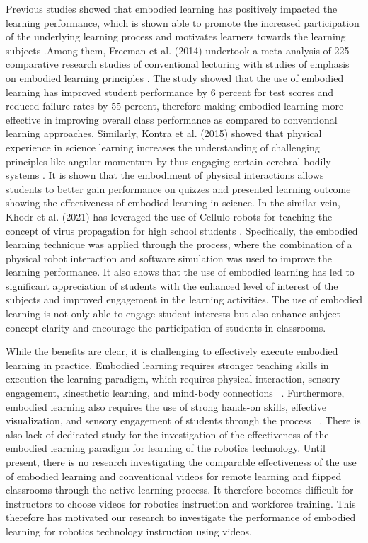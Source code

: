 \documentclass[12pt]{article}
\begin{document}
Previous studies showed that embodied learning has positively impacted the learning performance, which is shown able to promote the increased participation of the underlying learning process and motivates learners towards the learning subjects \cite{kontra2012embodied,ioannou2020technology}.Among them, Freeman et al. (2014) undertook a meta-analysis of 225 comparative research studies of conventional lecturing with studies of emphasis on embodied learning principles \cite{freeman2014active}. The study showed that the use of embodied learning has improved student performance by 6 percent for test scores and reduced failure rates by 55 percent, therefore making embodied learning more effective in improving overall class performance as compared to conventional learning approaches. Similarly, Kontra et al. (2015) showed that physical experience in science learning increases the understanding of challenging principles like angular momentum by thus engaging certain cerebral bodily systems \cite{kontra2015physical}. It is shown that the embodiment of physical interactions allows students to better gain performance on quizzes and presented learning outcome showing the effectiveness of embodied learning in science.  In the similar vein, Khodr et al. (2021) has leveraged the use of Cellulo robots for teaching the concept of virus propagation for  high school students \cite{khodr2021diseases}. Specifically, the embodied learning technique was applied through the process, where the combination of a physical robot interaction and software simulation was used to improve the learning performance. It also shows that the use of embodied learning has led to significant appreciation of students with the enhanced level of interest of the subjects and improved engagement in the learning activities. The use of embodied learning is not only able to engage student interests but also enhance subject concept clarity and encourage the participation of students in classrooms. 



\noindent While the benefits are clear, it is challenging to effectively execute embodied learning in practice. Embodied learning requires stronger teaching skills in execution the learning paradigm, which requires physical interaction, sensory engagement, kinesthetic learning, and mind-body connections ~\cite{anderson2003embodied,barsalou2008grounded,skulmowski2018embodied}. Furthermore, embodied learning also requires the use of strong hands-on skills, effective visualization, and sensory engagement of students through the process ~\cite{dede2014role,poria2017review}. There is also lack of dedicated study for the investigation of the effectiveness of the embodied learning paradigm for learning of the robotics technology. Until present, there is no research investigating the comparable effectiveness of the use of embodied learning and conventional videos for remote learning and flipped classrooms through the active learning process. It therefore becomes difficult for instructors to choose videos for robotics instruction and workforce training.  This therefore has motivated our research to investigate the performance of embodied learning for robotics technology instruction using videos.  
\end{document}
